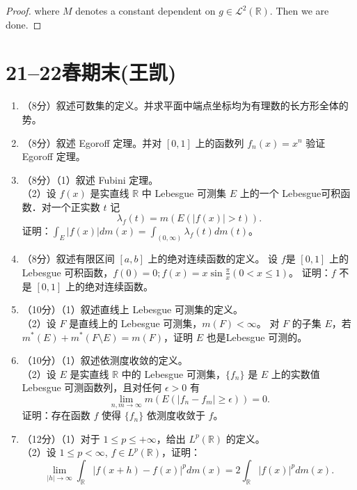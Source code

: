 \begin{itemize}
\begin{proof}
	where $M$ denotes a constant dependent on $g\in \mathcal{L}^{2}(\mathbb{R})$. Then we are done.
\end{proof}
\end{itemize}

\section{21--22春期末(王凯)}
\begin{enumerate}
\item（8分）叙述可数集的定义。并求平面中端点坐标均为有理数的长方形全体的势。

\item（8分）叙述 Egoroff 定理。并对 $[0,1]$ 上的函数列 $f_{n}(x)=x^{n}$ 验证 Egoroff 定理。

\item（8分）（1）叙述 Fubini 定理。\\
（2）设 $f(x)$ 是实直线 $\mathbb{R}$ 中 Lebesgue 可测集 $E$ 上的一个 Lebesgue可积函数．对一个正实数 $t$ 记
$$\lambda_{f}(t)=m(E(|f(x)|>t)).$$
证明：$\int_{E}|f(x)| dm(x)=\int_{(0, \infty)} \lambda_{f}(t) dm(t)$。

\item（8分）叙述有限区间 $[a, b]$ 上的绝对连续函数的定义。
设 $f$是 $[0,1]$ 上的 Lebesgue 可积函数，$f(0)=0 ; f(x)=x \sin \frac{\pi}{x}(0< x \leqslant 1)$。
证明：$f$ 不是 $[0,1]$ 上的绝对连续函数。

\item（10分）（1）叙述直线上 Lebesgue 可测集的定义。\\
（2）设 $F$ 是直线上的 Lebesgue 可测集，$m(F)<\infty$。
对 $F$ 的子集 $E$，若 $m^{*}(E)+m^{*}(F \setminus E)=m(F)$，证明 $E$ 也是Lebesgue 可测的。

\item（10分）（1）叙述依测度收敛的定义。\\
（2）设 $E$ 是实直线 $\mathbb{R}$ 中的 Lebesgue 可测集，$\{f_{n}\}$ 是 $E$ 上的实数值 Lebesgue 可测函数列，且对任何 $\epsilon>0$ 有
$$\lim_{n, m \rightarrow \infty} m(E(|f_{n}-f_{m}| \geqslant \epsilon))=0.$$
证明：存在函数 $f$ 使得 $\{f_{n}\}$ 依测度收敛于 $f$。

\item（12分）（1）对于 $1 \leqslant p \leqslant+\infty$，给出 $L^{p}(\mathbb{R})$ 的定义。\\
（2）设 $1 \leqslant p<\infty$, $f \in L^{p}(\mathbb{R})$，证明：
$$\lim_{|h| \rightarrow \infty} \int_{\mathbb{R}}|f(x+h)-f(x)|^{p} dm(x)
=2 \int_{\mathbb{R}}|f(x)|^{p} dm(x).$$


\end{enumerate}
